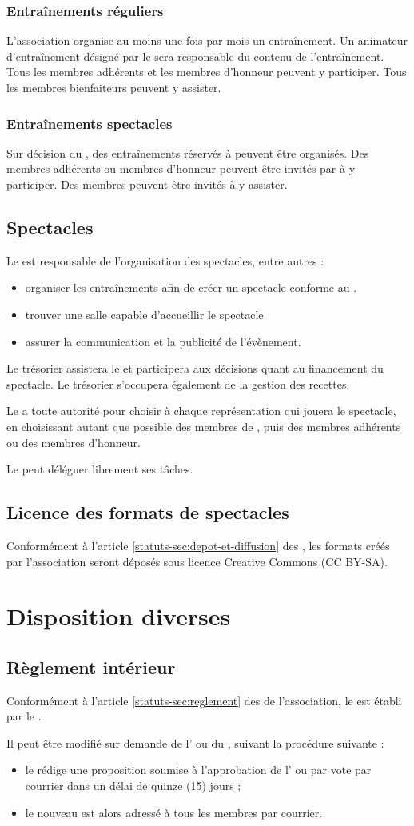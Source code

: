 \documentclass[a4paper,french,10pt]{article}
\newcommand{\article}[1]{\subsection{#1}\addtocounter{article}{1}}
\newcounter{article}
\newcommand{\artrefst}[1]{article \ref{statuts-#1} des \statuts{}}
\begin{document}
\subsubsection*{Entraînements réguliers}
L'association organise au moins une fois par mois un entraînement. Un animateur d'entraînement désigné par le \DA{} sera responsable du contenu de l'entraînement. Tous les membres adhérents et les membres d'honneur peuvent y participer. Tous les membres bienfaiteurs peuvent y assister.

\subsubsection*{Entraînements spectacles}
Sur décision du \DA{}, des entraînements réservés à \troupe{} peuvent être organisés. Des membres adhérents ou membres d'honneur peuvent être invités par \troupe{} à y participer. Des membres peuvent être invités à y assister.

\article{Spectacles}
\label{sec:spectacles}
Le \DA{} est responsable de l'organisation des spectacles, entre autres :
\begin{itemize}
\item organiser les entraînements afin de créer un spectacle conforme au \PA{}.
\item trouver une salle capable d'accueillir le spectacle
\item assurer la communication et la publicité de l'évènement.
\end{itemize}

Le trésorier assistera le \DA{} et participera aux décisions quant au financement du spectacle. Le trésorier s'occupera également de la gestion des recettes.

Le \DA{} a toute autorité pour choisir à chaque représentation qui jouera le spectacle, en choisissant autant que possible des membres de \troupe{}, puis des membres adhérents ou des membres d'honneur.

Le \DA{} peut déléguer librement ses tâches.

\article{Licence des formats de spectacles}
\label{sec:licence-des-formats}
Conformément à l'\artrefst{sec:depot-et-diffusion}, les formats créés par l'association seront déposés sous licence Creative Commons (CC BY-SA).


\section{Disposition diverses}
\article{Règlement intérieur}
\label{sec:reglement-interieur}
Conformément à l'\artrefst{sec:reglement} de l'association, le \RI{} est établi par le \bureau{}.

Il peut être modifié sur demande de l'\AG{} ou du \bureau{}, suivant la procédure suivante :
\begin{itemize}
\item le \bureau{} rédige une proposition soumise à l'approbation de l'\AG{} ou par vote par courrier dans un délai de quinze (15) jours ;
\item le nouveau \RI{} est alors adressé à tous les membres par courrier.
\end{itemize}
\end{document}
